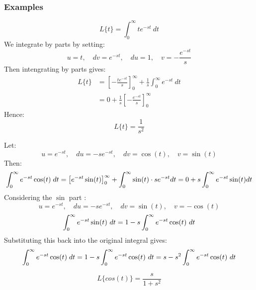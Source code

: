 \documentclass[a4paper, 10pt]{article}
\begin{document}
\subsubsection{Examples}

\begin{examplebox}[Use integration by parts to find the Laplace of $f(t) = t$]
  $$L\{t\} = \int_0^\infty te^{-st} \ dt$$
  We integrate by parts by setting:
  $$u = t, \quad dv = e^{-st}, \quad du = 1, \quad v = -\frac{e^{-st}}{s}$$
  Then intengrating by parts gives:
  \begin{align*}
    L\{t\} & = \left [ -\frac{te^{-st}}{s} \right ]_0^\infty + \frac{1}{s}\int_0^\infty e^{-st} \ dt \\
           & = 0 + \frac{1}{s}\left [ -\frac{e^{-st}}{s} \right ]_0^\infty
  \end{align*}
  Hence:
  $$L\{t\} = \frac{1}{s^2}$$
\end{examplebox}

\begin{examplebox}[Use integration by parts to find the Laplace of $f(t) = \cos(t)$]
  Let:
  $$u = e^{-st}, \quad du = -se^{-st}, \quad dv = \cos(t), \quad v = \sin(t)$$
  Then:
  $$
    \int_0^{\infty} e^{-st} \cos(t)\; dt = \left[ e^{-st} \sin(t) \right]_0^\infty + \int_0^{\infty} \sin(t)\cdot se^{-st} dt = 0 + s\int_0^{\infty} e^{-st} \sin(t) dt
  $$
  Considering the $\sin$ part :
  $$u = e^{-st}, \quad du = -se^{-st}, \quad dv = \sin(t), \quad v = -\cos(t)$$
  $$\int_0^{\infty} e^{-st} \sin(t)\ dt = 1 - s \int_0^{\infty} e^{-st} \cos(t) \ dt$$
  Substituting this back into the original integral gives:
  $$
    \intinf e^{-st} \cos(t)\; dt = 1 - s\intinf e^{-st} \cos(t)\ dt = s - s^2\intinf e^{-st} \cos(t)\ dt \\
  $$

  $$L\{cos(t)\}= \dfrac{s}{1+s^2}$$
\end{examplebox}
\end{document}
